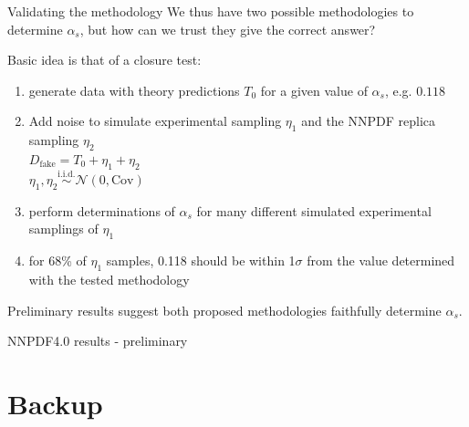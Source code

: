\documentclass[8pt,t]{beamer}
\begin{document}
\begin{frame}{Validating the methodology}
  We thus have two possible methodologies to determine $\alpha_s$, but how can we trust they give the correct answer?

  \vspace*{1em}
  Basic idea is that of a closure test:
  \begin{enumerate}
    \item generate data with theory predictions $T_0$ for a given value of $\alpha_s$, e.g. $0.118$
    \item Add noise to simulate experimental sampling $\eta_1$ and the NNPDF replica sampling $\eta_2$ \\
    $D_\mathrm{fake} = T_0 + \eta_1 + \eta_2$ \\
    $\eta_1, \eta_2  \overset{\text{i.i.d.}}{\sim} \mathcal{N}(0,\mathrm{Cov})$
    \item perform determinations of $\alpha_s$ for many different simulated experimental samplings of $\eta_1$
    \item for 68\% of $\eta_1$ samples, 0.118 should be within 1$\sigma$ from the value determined with the tested methodology
  \end{enumerate}

  \vspace*{1em}
  Preliminary results suggest both proposed methodologies faithfully determine $\alpha_s$.
\end{frame}


\begin{frame}{NNPDF4.0 results - preliminary}
\end{frame}



\appendix
\section{Backup}


\end{document}
